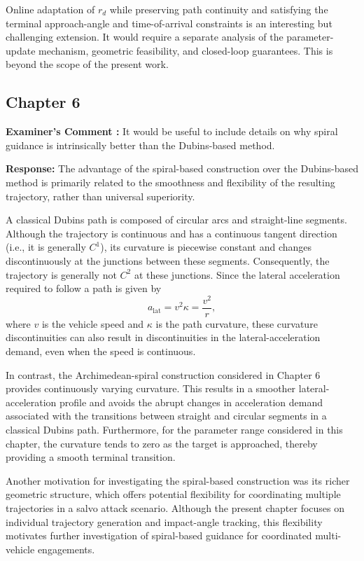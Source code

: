 \documentclass[11pt,a4paper]{article}
\newcounter{examcomment}
\renewcommand{\theexamcomment}{\arabic{examcomment}}
\newcommand{\comment}[1]{%
	\refstepcounter{examcomment}%
	\par\vspace{5pt}\noindent
	\colorbox{gray!13}{%
		\parbox{\dimexpr\linewidth-2\fboxsep}{%
			\textbf{Examiner's Comment \theexamcomment:} #1%
		}%
	}%
	\par
}
\newcommand{\response}{\par\textbf{Response:} }
\newcommand{\revision}{\par\textbf{Proposed thesis revision:} }
\begin{document}
Online adaptation of $r_d$ while preserving path continuity and satisfying the terminal approach-angle and time-of-arrival
constraints is an interesting but challenging extension. It would require a separate analysis of the parameter-update mechanism, geometric feasibility, and closed-loop guarantees. This is beyond the scope of the present work.


\subsection*{Chapter 6}

\comment{It would be useful to include details on why spiral guidance is intrinsically better than the Dubins-based method.}
\response
The advantage of the spiral-based construction over the Dubins-based
method is primarily related to the smoothness and flexibility of the
resulting trajectory, rather than universal superiority.

A classical Dubins path is composed of circular arcs and straight-line
segments. Although the trajectory is continuous and has a continuous
tangent direction (i.e., it is generally $C^1$), its curvature is
piecewise constant and changes discontinuously at the junctions
between these segments. Consequently, the trajectory is generally
not $C^2$ at these junctions. Since the lateral acceleration required
to follow a path is given by
\[
a_{\mathrm{lat}}=v^2\kappa=\frac{v^2}{r},
\]
where $v$ is the vehicle speed and $\kappa$ is the path curvature,
these curvature discontinuities can also result in discontinuities
in the lateral-acceleration demand, even when the speed is continuous.

In contrast, the Archimedean-spiral construction considered in
Chapter 6 provides continuously varying curvature. This results
in a smoother lateral-acceleration profile and avoids the abrupt
changes in acceleration demand associated with the transitions
between straight and circular segments in a classical Dubins path.
Furthermore, for the parameter range considered in this chapter,
the curvature tends to zero as the target is approached, thereby
providing a smooth terminal transition.

Another motivation for investigating the spiral-based construction
was its richer geometric structure, which offers potential flexibility
for coordinating multiple trajectories in a salvo attack scenario.
Although the present chapter focuses on individual trajectory
generation and impact-angle tracking, this flexibility motivates
further investigation of spiral-based guidance for coordinated
multi-vehicle engagements.
\end{document}
